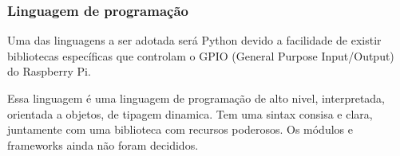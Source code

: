\subsubsection{Linguagem de programação}

Uma das linguagens a ser adotada será Python devido a facilidade de existir bibliotecas específicas que controlam o GPIO (General Purpose Input/Output) do Raspberry Pi.

Essa linguagem é uma linguagem de programação de alto nivel, interpretada, orientada a objetos, de tipagem dinamica. Tem uma sintax consisa e clara, juntamente com uma biblioteca com recursos poderosos. Os módulos e frameworks ainda não foram decididos.
